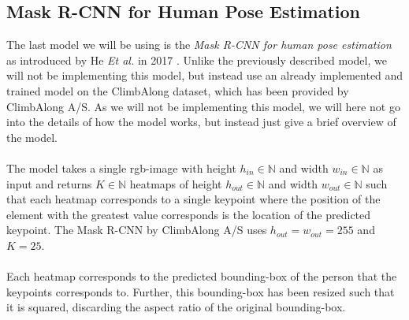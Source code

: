 \documentclass[./main.tex]{subfiles}
\begin{document}
\subsection{Mask R-CNN for Human Pose Estimation}
The last model we will be using is the \textit{Mask R-CNN for human pose estimation} as introduced by He \textit{Et al.} in 2017 \cite{https://doi.org/10.48550/arxiv.1703.06870}. Unlike the previously described model, we will not be implementing this model, but instead use an already implemented and trained model on the ClimbAlong dataset, which has been provided by ClimbAlong A/S. As we will not be implementing this model, we will here not go into the details of how the model works, but instead just give a brief overview of the model.
\\
\\
The model takes a single rgb-image with height $h_{in} \in \mathbb{N}$ and width $w_{in} \in \mathbb{N}$ as input and returns $K \in \mathbb{N}$ heatmaps of height $h_{out} \in \mathbb{N}$ and width $w_{out} \in \mathbb{N}$ such that each heatmap corresponds to a single keypoint where the position of the element with the greatest value corresponds is the location of the predicted keypoint. The Mask R-CNN by ClimbAlong A/S uses $h_{out} = w_{out} = 255$ and $K = 25$.
\\
\\
Each heatmap corresponds to the predicted bounding-box of the person that the keypoints corresponds to. Further, this bounding-box has been resized such that it is squared, discarding the aspect ratio of the original bounding-box.
\end{document}
